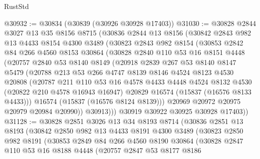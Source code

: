 \begin{lexlean}{RustStd}
\begin{coremodule}
{\begin{coremodule}
{{{{{{{{{{{{{{{{{{{{{{{{{{{{{{{{{{{{{{{{{{{{{{{{{{{{{{{{{{{{@30932 := @30834 (@30839 (@30926 @30928 @17403))
@31030 := @30828
    @2844
    @3027
    @13
    @35
    @8156
    @8715
    (@30836
      @2844
      @13
      @8156
      (@30842
        @2843
        @982
        @13
        @4433
        @8154
        @4300
        @3489
        (@30823
          @2843
          @982
          @8154
          (@30853
            @2842
            @84
            @266
            @4560
            @8153
            @30864
            (@30828
              @2840
              @110
              @53
              @16
              @8151
              @4448
              (@20757
                @2840
                @53
                @8140
                @8149
                (@20918
                  @2839
                  @267
                  @53
                  @8140
                  @8147
                  @5479
                  (@20788
                    @213
                    @53
                    @266
                    @4747
                    @8139
                    @8146
                    @4524
                    @8123
                    @4530
                    @20808
                    (@20787
                      @211
                      @110
                      @53
                      @16
                      @4578
                      @4433
                      @4448
                      @4524
                      @8132
                      @4530
                      (@20822 @210 @4578 @16943 @16947)
                      @20829
                      @16574
                      (@15837 (@16576 @8133 @4433)))
                    @16574
                    (@15837 (@16576 @8124 @8139)))
                  @20969
                  @20972
                  @20975
                  @20979
                  @20984
                  @20990))
              @30913)))
        @30919
        @30922
        @30925
        @30928
        @17403))
@31128 := @30828
    @2851
    @3026
    @13
    @34
    @8193
    @8714
    (@30836
      @2851
      @13
      @8193
      (@30842
        @2850
        @982
        @13
        @4433
        @8191
        @4300
        @3489
        (@30823
          @2850
          @982
          @8191
          (@30853
            @2849
            @84
            @266
            @4560
            @8190
            @30864
            (@30828
              @2847
              @110
              @53
              @16
              @8188
              @4448
              (@20757
                @2847
                @53
                @8177
                @8186
}}}}}}}}}}}}}}}}}}}}}}}}}}}}}}}}}}}}}}}}}}}}}}}}}}}}}}}}}}}}
\end{coremodule}}
\end{coremodule}
\end{lexlean}
